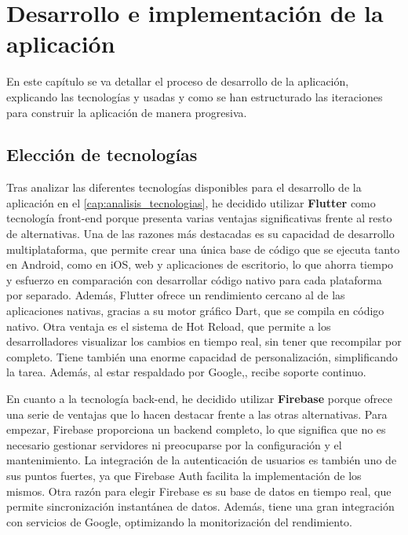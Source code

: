 \chapter{Desarrollo e implementación de la aplicación}
\label{chap:desarrollo}

En este capítulo se va detallar el proceso de desarrollo de la aplicación, explicando las tecnologías y usadas y como 
se han estructurado las iteraciones para construir la aplicación de manera progresiva.

\section{Elección de tecnologías}
\label{sec:justificacion}
Tras analizar las diferentes tecnologías disponibles para el desarrollo de la aplicación en el \autoref{cap:analisis_tecnologias}, he decidido utilizar \textbf{Flutter} como tecnología front-end 
porque presenta varias ventajas significativas frente al resto de alternativas. Una de las razones más destacadas es su capacidad de desarrollo multiplataforma, 
que permite crear una única base de código que se ejecuta tanto en Android, como en iOS, web y aplicaciones de escritorio, lo que ahorra tiempo 
y esfuerzo en comparación con desarrollar código nativo para cada plataforma por separado. Además, Flutter ofrece un rendimiento cercano al 
de las aplicaciones nativas, gracias a su motor gráfico Dart, que se compila en código nativo. Otra ventaja es el sistema de Hot Reload, que permite 
a los desarrolladores visualizar los cambios en tiempo real, sin tener que recompilar por completo. Tiene también una enorme capacidad de 
personalización, simplificando la tarea. Además, al estar respaldado por Google,, recibe soporte continuo.



En cuanto a la tecnología back-end, he decidido utilizar \textbf{Firebase} porque ofrece una serie de ventajas que lo hacen destacar frente a las
otras alternativas. Para empezar, Firebase proporciona un backend completo, lo que significa que no es necesario gestionar servidores ni 
preocuparse por la configuración y el mantenimiento. La integración de la autenticación de usuarios es también uno de sus puntos fuertes, ya que 
Firebase Auth facilita la implementación de los mismos. Otra razón para elegir Firebase es su base de datos en tiempo real, que permite 
sincronización instantánea de datos. Además, tiene una gran integración con servicios de Google, optimizando la monitorización del rendimiento.



